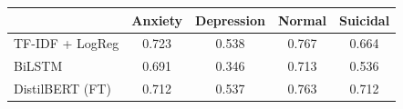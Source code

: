 \begin{tabular}{lcccc}
\toprule
 & Anxiety & Depression & Normal & Suicidal \\
\midrule
TF-IDF + LogReg & 0.723 & 0.538 & 0.767 & 0.664 \\
BiLSTM & 0.691 & 0.346 & 0.713 & 0.536 \\
DistilBERT (FT) & 0.712 & 0.537 & 0.763 & 0.712 \\
\bottomrule
\end{tabular}
